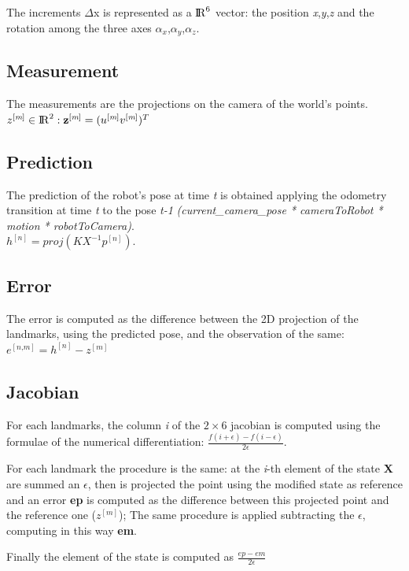 \documentclass[10pt]{article}
\begin{document}
	The increments $\Delta$x is represented as a ${\rm I\!R}^6$ vector: the position \textit{x},\textit{y},\textit{z} and the rotation among the three axes \textit{$\alpha_x$},\textit{$\alpha_y$},\textit{$\alpha_z$}.
	
	\subsection{Measurement}
	The measurements are the projections on the camera of the world's points.
	$z^{[\textit{m}]} \in {\rm I\!R}^2 : \textbf{z}^{[\textit{m}]} = (u^{[\textit{m}]} v^{[\textit{m}]})^T$
	
	\subsection{Prediction}
	The prediction of the robot's pose at time \textit{t} is obtained applying the odometry transition at time \textit{t} to the pose \textit{t-1} \textit{(current\_camera\_pose * cameraToRobot * motion * robotToCamera)}. \\
	$h^{[\textit{n}]} = proj(K X^{-1} p^{[\textit{n}]})$.
	
	\subsection{Error}
	The error is computed as the difference between the 2D projection of the landmarks, using the predicted pose, and the observation of the same:\\
	$e^{[\textit{n,m}]} = h^{[\textit{n}]} - z^{[\textit{m}]}$
	
	\subsection{Jacobian}
	For each landmarks, the column \textit{i} of the $2\times6$ jacobian is computed using the formulae of the numerical differentiation: $ \frac{f(i +  \epsilon) - f(i-\epsilon)}{2\epsilon}$.
	
	For each landmark the procedure is the same: at the \textit{i}-th element of the state \textbf{X} are summed an $\epsilon$, then is projected the point using the modified state as reference and an error \textbf{ep} is computed as the difference between this projected point and the reference one ($z^{[\textit{m}]}$);
	The same procedure is applied subtracting the $\epsilon$, computing in this way \textbf{em}.
	
	Finally the element of the state is computed as $\frac{ep - em}{2\epsilon}$
	
\end{document}
